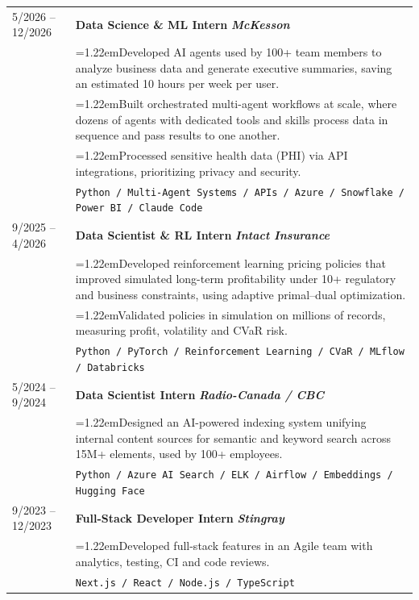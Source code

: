 \documentclass[a4paper,10pt]{article}
\newcommand{\bul}{\hangindent=1.22em\hangafter=1\hspace{0.5em}\textbullet\hspace{0.4em}}
\begin{document}
\begin{tabularx}{\textwidth}{@{}p{3cm} X@{}}
    5/2026 -- 12/2026 &
    \textbf{Data Science \& ML Intern} \hfill \textbf{\textit{McKesson}}\\[0.2em]
    & \bul Developed AI agents used by 100+ team members to analyze business data and generate executive summaries, saving an estimated 10 hours per week per user. \\
    & \bul Built orchestrated multi-agent workflows at scale, where dozens of agents with dedicated tools and skills process data in sequence and pass results to one another. \\
    & \bul Processed sensitive health data (PHI) via API integrations, prioritizing privacy and security. \\
    & \texttt{Python / Multi-Agent Systems / APIs / Azure / Snowflake / Power BI / Claude Code} \\[0.5em]

    9/2025 -- 4/2026 & 
    \textbf{Data Scientist \& RL Intern} \hfill \textbf{\textit{Intact Insurance}}\\[0.2em]
    & \bul Developed reinforcement learning pricing policies that improved simulated long-term profitability under 10+ regulatory and business constraints, using adaptive primal--dual optimization.\\
    & \bul Validated policies in simulation on millions of records, measuring profit, volatility and CVaR risk.\\
    & \texttt{Python / PyTorch / Reinforcement Learning / CVaR / MLflow / Databricks} \\[0.5em]

    5/2024 -- 9/2024 & \textbf{Data Scientist Intern} \hfill \textbf{\textit{Radio-Canada / CBC}} \\
    & \bul Designed an AI-powered indexing system unifying internal content sources for semantic and keyword search across 15M+ elements, used by 100+ employees.\\
    & \texttt{Python / Azure AI Search / ELK / Airflow / Embeddings / Hugging Face} \\[0.5em]

    9/2023 -- 12/2023 & \textbf{Full-Stack Developer Intern} \hfill \textbf{\textit{Stingray}} \\
    & \bul Developed full-stack features in an Agile team with analytics, testing, CI and code reviews. \\
    & \texttt{Next.js / React / Node.js / TypeScript} \\[0.5em]
\end{tabularx}
\end{document}
